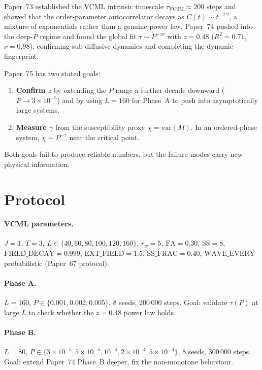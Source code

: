 \documentclass[12pt,a4paper]{article}
\begin{document}
Paper~73 established the VCML intrinsic timescale $\tau_\mathrm{VCSM}\approx 200$ steps and showed
that the order-parameter autocorrelator decays as $C(t)\sim t^{-2.2}$, a mixture of exponentials
rather than a genuine power law.  Paper~74 pushed into the deep-$P$ regime and found the global fit
$\tau \sim P^{-z\nu}$ with $z=0.48$ ($R^2=0.71$, $\nu=0.98$), confirming sub-diffusive dynamics
and completing the dynamic fingerprint.

Paper~75 has two stated goals:
\begin{enumerate}
  \item \textbf{Confirm $z$} by extending the $P$ range a further decade downward
        ($P \to 3\times10^{-5}$) and by using $L=160$ for Phase~A to push into asymptotically
        large systems.
  \item \textbf{Measure $\gamma$} from the susceptibility proxy $\chi = \mathrm{var}(M)$.
        In an ordered-phase system, $\chi \sim P^{-\gamma}$ near the critical point.
\end{enumerate}
Both goals fail to produce reliable numbers, but the failure modes carry new physical information.

\section{Protocol}

\paragraph{VCML parameters.}
$J=1$, $T=3$, $L\in\{40,60,80,100,120,160\}$, $r_w=5$, $\mathrm{FA}=0.30$,
$\mathrm{SS}=8$, $\mathrm{FIELD\_DECAY}=0.999$, $\mathrm{EXT\_FIELD}=1.5$,
$\mathrm{SS\_FRAC}=0.40$, $\mathrm{WAVE\_EVERY}$ probabilistic (Paper~67 protocol).

\paragraph{Phase A.} $L=160$, $P \in \{0.001, 0.002, 0.005\}$, 8 seeds, 200\,000 steps.
Goal: validate $\tau(P)$ at large $L$ to check whether the $z=0.48$ power law holds.

\paragraph{Phase B.} $L=80$, $P \in \{3\times10^{-5}, 5\times10^{-5}, 10^{-4}, 2\times10^{-4}, 5\times10^{-4}\}$,
8 seeds, 300\,000 steps.  Goal: extend Paper~74 Phase~B deeper, fix the non-monotone behaviour.
\end{document}
